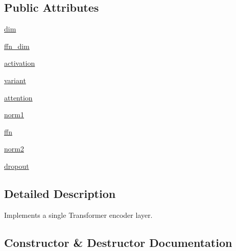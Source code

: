 \subsection*{Public Attributes}
\begin{DoxyCompactItemize}
\item 
\hyperlink{classparlai_1_1agents_1_1transformer_1_1modules_1_1TransformerEncoderLayer_ae0f31a52dac8d678fdf6ba573201e7d7}{dim}
\item 
\hyperlink{classparlai_1_1agents_1_1transformer_1_1modules_1_1TransformerEncoderLayer_abcdb8b9abb049afacdd132d2a811faff}{ffn\+\_\+dim}
\item 
\hyperlink{classparlai_1_1agents_1_1transformer_1_1modules_1_1TransformerEncoderLayer_a2986c3841832cc56d76908347f22a0a3}{activation}
\item 
\hyperlink{classparlai_1_1agents_1_1transformer_1_1modules_1_1TransformerEncoderLayer_a33ff5864b155499ecf8d31383b33e8d8}{variant}
\item 
\hyperlink{classparlai_1_1agents_1_1transformer_1_1modules_1_1TransformerEncoderLayer_ad8b0a3b903ca2595e72dd54f82f4dd9f}{attention}
\item 
\hyperlink{classparlai_1_1agents_1_1transformer_1_1modules_1_1TransformerEncoderLayer_a74730602aaea5afd4564d0f35c84af15}{norm1}
\item 
\hyperlink{classparlai_1_1agents_1_1transformer_1_1modules_1_1TransformerEncoderLayer_a2f40ac67a332293a3f51eb11647e2ec1}{ffn}
\item 
\hyperlink{classparlai_1_1agents_1_1transformer_1_1modules_1_1TransformerEncoderLayer_acc0beb3a5c95f3ab45b13dff322e4225}{norm2}
\item 
\hyperlink{classparlai_1_1agents_1_1transformer_1_1modules_1_1TransformerEncoderLayer_a3bcd00a8073a48b6a1626fccb87be143}{dropout}
\end{DoxyCompactItemize}


\subsection{Detailed Description}
\begin{DoxyVerb}Implements a single Transformer encoder layer.
\end{DoxyVerb}
 

\subsection{Constructor \& Destructor Documentation}
\mbox{\label{classparlai_1_1agents_1_1transformer_1_1modules_1_1TransformerEncoderLayer_a68caa3f119bfb946e34b7cf3c8bd9e48}} 
